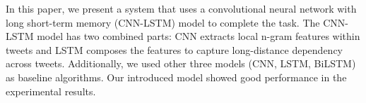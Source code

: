 In this paper, we present a system that uses a convolutional neural network with long short-term memory (CNN-LSTM) model to complete the task. The CNN-LSTM model has two combined parts: CNN extracts local n-gram features within tweets and LSTM composes the features to capture long-distance dependency across tweets. Additionally, we used other three models (CNN, LSTM, BiLSTM) as baseline algorithms. Our introduced model showed good performance in the experimental results.
